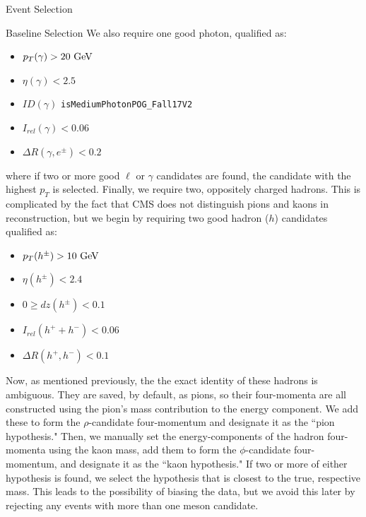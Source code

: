 \begin{section}{Event Selection}
\begin{subsection}{Baseline Selection}
\noindent We also require one good photon, qualified as:
\begin{itemize}
    \item $p_{T}(\gamma) > 20\textnormal{ GeV}$
    \item $\eta(\gamma) < 2.5$
    \item $ID(\gamma)$ \verb|isMediumPhotonPOG_Fall17V2|
    \item $I_{rel}(\gamma) < 0.06$
    \item $\Delta R(\gamma, e^{\pm}) < 0.2$
\end{itemize}
\noindent where if two or more good $\ell$ or $\gamma$ candidates are found, the candidate with the highest $p_{T}$ is selected. Finally, we require two, oppositely charged hadrons. This is complicated by the fact that CMS does not distinguish pions and kaons in reconstruction, but we begin by requiring two good hadron ($h$) candidates qualified as:
\begin{itemize}
    \item $p_{T}(h^{\pm}) > 10\textnormal{ GeV}$
    \item $\eta(h^{\pm}) < 2.4$
    \item $0 \geq dz(h^{\pm}) < 0.1$
    \item $I_{rel}(h^{+}+h^{-}) < 0.06$
    \item $\Delta R(h^{+}, h^{-}) < 0.1$
\end{itemize}
\noindent Now, as mentioned previously, the the exact identity of these hadrons is ambiguous. They are saved, by default, as pions, so their four-momenta are all constructed using the pion's mass contribution to the energy component. We add these to form the $\rho$-candidate four-momentum and designate it as the ``pion hypothesis." Then, we manually set the energy-components of the hadron four-momenta using the kaon mass, add them to form the $\phi$-candidate four-momentum, and designate it as the ``kaon hypothesis." If two or more of either hypothesis is found, we select the hypothesis that is closest to the true, respective mass. This leads to the possibility of biasing the data, but we avoid this later by rejecting any events with more than one meson candidate.
\end{subsection}
\end{section}

